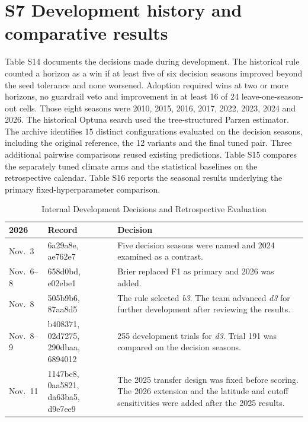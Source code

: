 \documentclass[10pt]{article}
\newcommand{\bthree}{\textit{b3}}
\newcommand{\dthree}{\textit{d3}}
\begin{document}
\section*{S7 Development history and comparative results}
Table S14 documents the decisions made during development. The historical rule counted a horizon as a win if at least five of six decision seasons improved beyond the seed tolerance and none worsened. Adoption required wins at two or more horizons, no guardrail veto and improvement in at least 16 of 24 leave-one-season-out cells. Those eight seasons were 2010, 2015, 2016, 2017, 2022, 2023, 2024 and 2026. The historical Optuna search used the tree-structured Parzen estimator. The archive identifies 15 distinct configurations evaluated on the decision seasons, including the original reference, the 12 variants and the final tuned pair. Three additional pairwise comparisons reused existing predictions. Table S15 compares the separately tuned climate arms and the statistical baselines on the retrospective calendar. Table S16 reports the seasonal results underlying the primary fixed-hyperparameter comparison.

\begin{table}[!h]
\caption{Internal Development Decisions and Retrospective Evaluation}
\label{tab:decisions}
\centering
\setlength{\tabcolsep}{3pt}
\begin{tabular}{@{}p{} p{} p{}@{}}
\toprule
2026 & Record & Decision\\
\midrule
Nov.\ 3 & 6a29a8e, ae762e7 & Five decision seasons were named and 2024 examined as a contrast.\\
Nov.\ 6--8 & 658d0bd, e02ebe1 & Brier replaced F1 as primary and 2026 was added.\\
Nov.\ 8 & 505b9b6, 87aa8d5 & The rule selected \bthree{}. The team advanced \dthree{} for further development after reviewing the results.\\
Nov.\ 8--9 & b408371, 02d7275, 290dbaa, 6894012 & 255 development trials for \dthree{}. Trial 191 was compared on the decision seasons.\\
Nov.\ 11 & 1147be8, 0aa5821, da63ba5, d9e7ee9 & The 2025 transfer design was fixed before scoring. The 2026 extension and the latitude and cutoff sensitivities were added after the 2025 results.\\
\bottomrule
\end{tabular}
\end{table}
\end{document}
